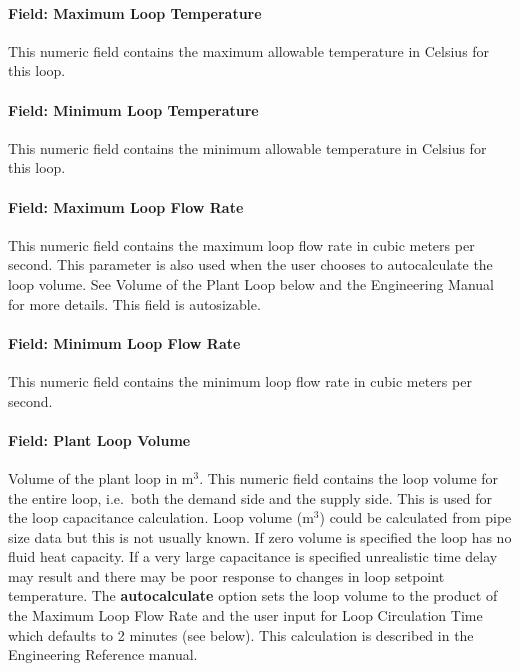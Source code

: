\paragraph{Field: Maximum Loop Temperature}\label{field-maximum-loop-temperature}

This numeric field contains the maximum allowable temperature in Celsius for this loop.

\paragraph{Field: Minimum Loop Temperature}\label{field-minimum-loop-temperature}

This numeric field contains the minimum allowable temperature in Celsius for this loop.

\paragraph{Field: Maximum Loop Flow Rate}\label{field-maximum-loop-flow-rate}

This numeric field contains the maximum loop flow rate in cubic meters per second. This parameter is also used when the user chooses to autocalculate the loop volume. See Volume of the Plant Loop below and the Engineering Manual for more details. This field is autosizable.

\paragraph{Field: Minimum Loop Flow Rate}\label{field-minimum-loop-flow-rate}

This numeric field contains the minimum loop flow rate in cubic meters per second.

\paragraph{Field: Plant Loop Volume}\label{field-plant-loop-volume}

Volume of the plant loop in m\(^{3}\). This numeric field contains the loop volume for the entire loop, i.e.~both the demand side and the supply side. This is used for the loop capacitance calculation. Loop volume (m\(^{3}\)) could be calculated from pipe size data but this is not usually known. If zero volume is specified the loop has no fluid heat capacity. If a very large capacitance is specified unrealistic time delay may result and there may be poor response to changes in loop setpoint temperature. The \textbf{autocalculate} option sets the loop volume to the product of the Maximum Loop Flow Rate and the user input for Loop Circulation Time which defaults to 2 minutes (see below). This calculation is described in the Engineering Reference manual.


